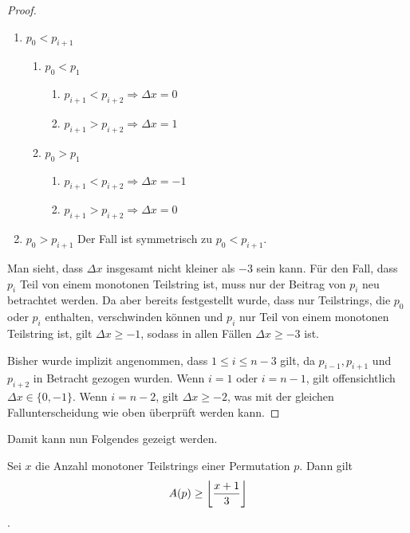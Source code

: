 \documentclass[a4paper, 11pt, ngerman]{article}
\begin{document}
\begin{proof}
    \begin{enumerate}
        \item $p_0 < p_{i + 1}$
              \begin{enumerate}
                  \item $p_0 < p_1$
                        \begin{enumerate}
                            \item $p_{i + 1} < p_{i + 2} \Longrightarrow \Delta x = 0$
                            \item $p_{i + 1} > p_{i + 2} \Longrightarrow \Delta x = 1$
                        \end{enumerate}
                  \item $p_0 > p_1$
                        \begin{enumerate}
                            \item $p_{i + 1} < p_{i + 2} \Longrightarrow \Delta x = -1$
                            \item $p_{i + 1} > p_{i + 2} \Longrightarrow \Delta x = 0$
                        \end{enumerate}
              \end{enumerate}
        \item $p_0 > p_{i + 1}$ Der Fall ist symmetrisch zu $p_0 < p_{i + 1}$.
    \end{enumerate}

    \noindent Man sieht, dass $\Delta x$ insgesamt nicht kleiner als $-3$ sein kann. Für den Fall, dass $p_i$ Teil von einem monotonen Teilstring ist, muss nur der Beitrag von $p_i$ neu betrachtet werden. Da aber bereits festgestellt wurde, dass nur Teilstrings, die $p_0$ oder $p_i$ enthalten, verschwinden können und $p_i$ nur Teil von einem monotonen Teilstring ist, gilt $\Delta x \ge -1$, sodass in allen Fällen $\Delta x \ge - 3$ ist.

    Bisher wurde implizit angenommen, dass $1 \le i \le n - 3$ gilt, da $p_{i-1}, p_{i + 1}$ und $p_{i + 2}$ in Betracht gezogen wurden. Wenn $i = 1$ oder $i = n - 1$, gilt offensichtlich $\Delta x \in \{0, -1\}$. Wenn $i = n - 2$, gilt $\Delta x \ge -2$, was mit der gleichen Fallunterscheidung wie oben überprüft werden kann.
\end{proof}

\noindent Damit kann nun Folgendes gezeigt werden.

\begin{theorem}
    Sei $x$ die Anzahl monotoner Teilstrings einer Permutation $p$. Dann gilt
    $$ A(p) \ge \bigg{\lfloor} \frac {x + 1} 3 \bigg{\rfloor} $$.
\end{theorem}
\end{document}
